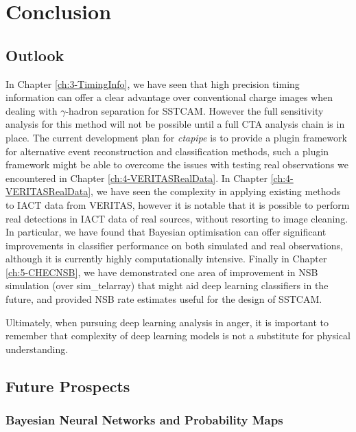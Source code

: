 \chapter{\label{ch6-Conclusions} Conclusion}
\minitoc
\section{Outlook}

In Chapter \ref{ch:3-TimingInfo}, we have seen that high precision timing information can offer a clear advantage over conventional charge images when dealing with $\gamma$-hadron separation for SSTCAM. However the full sensitivity analysis for this method will not be possible until a full CTA analysis chain is in place. The current development plan for \textit{ctapipe} is to provide a plugin framework for alternative event reconstruction and classification methods, such a plugin framework might be able to overcome the issues with testing real observations we encountered in Chapter \ref{ch:4-VERITASRealData}. In Chapter \ref{ch:4-VERITASRealData}, we have seen the complexity in applying existing methods to IACT data from VERITAS, however it is notable that it is possible to perform real detections in IACT data of real sources, without resorting to image cleaning. In particular, we have found that Bayesian optimisation can offer significant improvements in classifier performance on both simulated and real observations, although it is currently highly computationally intensive. Finally in Chapter \ref{ch:5-CHECNSB}, we have demonstrated one area of improvement in NSB simulation (over sim\_telarray) that might aid deep learning classifiers in the future, and provided NSB rate estimates useful for the design of SSTCAM.

Ultimately, when pursuing deep learning analysis in anger, it is important to remember that complexity of deep learning models is not a substitute for physical understanding.

\section{Future Prospects}

\subsection{Bayesian Neural Networks and Probability Maps}

